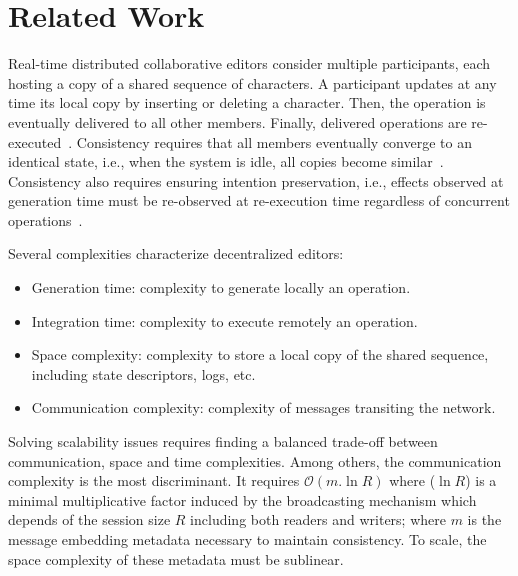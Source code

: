 \section{Related Work}
\label{sec:relatedwork}

Real-time distributed collaborative editors consider multiple
participants, each hosting a copy of a shared sequence of
characters. A participant updates at any time its local copy by
inserting or deleting a character. Then, the operation is eventually
delivered to all other members. Finally, delivered operations are
re-executed~\cite{saito2005optimistic}. Consistency requires that all
members eventually converge to an identical state, i.e., when the
system is idle, all copies become
similar~\cite{bailis2013eventual}. Consistency also requires ensuring
intention preservation, i.e., effects observed at generation time must
be re-observed at re-execution time regardless of concurrent
operations~\cite{sun1998achieving}. 

Several complexities characterize decentralized editors:
\begin{itemize}
\item Generation time: complexity to generate locally an operation.
\item Integration time: complexity to execute remotely an operation.
\item Space complexity: complexity to store a local copy of the shared sequence,
  including state descriptors, logs, etc.
\item Communication complexity: complexity of messages transiting the network.
\end{itemize}
Solving scalability issues requires finding a balanced trade-off between
communication, space and time complexities.  Among others, the communication
complexity is the most discriminant. It requires $\mathcal{O}(m.\ln{R})$ where
($\ln{R}$) is a minimal multiplicative factor induced by the broadcasting
mechanism which depends of the session size $R$ including both readers and
writers; where $m$ is the message embedding metadata necessary to maintain
consistency. To scale, the space complexity of these metadata must be sublinear.

